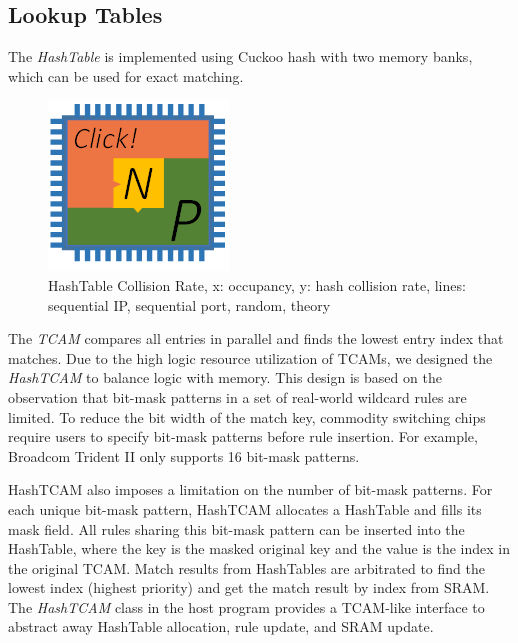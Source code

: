\subsection{Lookup Tables}
\label{clicknp:subsec:lookuptables}

The \textit{HashTable} is implemented using Cuckoo hash \cite{pagh2004cuckoo} with two memory banks, which can be used for exact matching.

\begin{figure}[h!]
	\centering
	\includegraphics[width=0.6\columnwidth]{image/logo}
	\vspace{-0.15in}
	\caption{HashTable Collision Rate, x: occupancy, y: hash collision rate, lines: sequential IP, sequential port, random, theory}
	\vspace{-0.15in}
	\label{clicknp:fig:HashTableCollisionRate}
\end{figure}

The \textit{TCAM} compares all entries in parallel and finds the lowest entry index that matches. Due to the high logic resource utilization of TCAMs, we designed the \textit{HashTCAM} to balance logic with memory. This design is based on the observation that bit-mask patterns in a set of real-world wildcard rules are limited. To reduce the bit width of the match key, commodity switching chips require users to specify bit-mask patterns before rule insertion. For example, Broadcom Trident II \cite{broadcomethernet} only supports 16 bit-mask patterns.

HashTCAM also imposes a limitation on the number of bit-mask patterns. For each unique bit-mask pattern, HashTCAM allocates a HashTable and fills its mask field. All rules sharing this bit-mask pattern can be inserted into the HashTable, where the key is the masked original key and the value is the index in the original TCAM. Match results from HashTables are arbitrated to find the lowest index (highest priority) and get the match result by index from SRAM. The \textit{HashTCAM} class in the host program provides a TCAM-like interface to abstract away HashTable allocation, rule update, and SRAM update.

